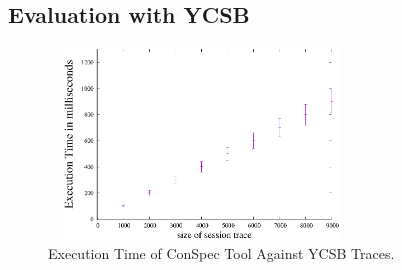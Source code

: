\documentclass[journal, compsoc]{IEEEtran}
\begin{document}
	\subsection{Evaluation with YCSB}\label{sec:evalycsb}
	\begin{figure}%
		\includegraphics[width=3.2in,height=2in]
		{conspecYCSBvarhist.eps} %
		\caption{Execution Time of ConSpec Tool Against YCSB Traces.}
		\label{fig:examplefull}
	\end{figure}
	
\end{document}
